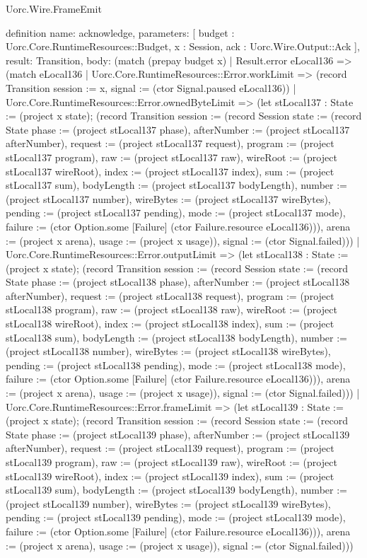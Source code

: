 \begin{lexlean}{Uorc.Wire.FrameEmit}
\begin{semanticmodule}
definition{
  name: acknowledge,
  parameters: [
    budget : Uorc.Core.RuntimeResources::Budget,
    x : Session,
    ack : Uorc.Wire.Output::Ack
  ],
  result: Transition,
  body: (match (prepay budget x)
    | Result.error eLocal136 => (match eLocal136
      | Uorc.Core.RuntimeResources::Error.workLimit => (record Transition {session := x, signal := (ctor Signal.paused eLocal136)})
      | Uorc.Core.RuntimeResources::Error.ownedByteLimit => (let stLocal137 : State := (project x state); (record Transition {session := (record Session {state := (record State {phase := (project stLocal137 phase), afterNumber := (project stLocal137 afterNumber), request := (project stLocal137 request), program := (project stLocal137 program), raw := (project stLocal137 raw), wireRoot := (project stLocal137 wireRoot), index := (project stLocal137 index), sum := (project stLocal137 sum), bodyLength := (project stLocal137 bodyLength), number := (project stLocal137 number), wireBytes := (project stLocal137 wireBytes), pending := (project stLocal137 pending), mode := (project stLocal137 mode), failure := (ctor Option.some [Failure] (ctor Failure.resource eLocal136))}), arena := (project x arena), usage := (project x usage)}), signal := (ctor Signal.failed)}))
      | Uorc.Core.RuntimeResources::Error.outputLimit => (let stLocal138 : State := (project x state); (record Transition {session := (record Session {state := (record State {phase := (project stLocal138 phase), afterNumber := (project stLocal138 afterNumber), request := (project stLocal138 request), program := (project stLocal138 program), raw := (project stLocal138 raw), wireRoot := (project stLocal138 wireRoot), index := (project stLocal138 index), sum := (project stLocal138 sum), bodyLength := (project stLocal138 bodyLength), number := (project stLocal138 number), wireBytes := (project stLocal138 wireBytes), pending := (project stLocal138 pending), mode := (project stLocal138 mode), failure := (ctor Option.some [Failure] (ctor Failure.resource eLocal136))}), arena := (project x arena), usage := (project x usage)}), signal := (ctor Signal.failed)}))
      | Uorc.Core.RuntimeResources::Error.frameLimit => (let stLocal139 : State := (project x state); (record Transition {session := (record Session {state := (record State {phase := (project stLocal139 phase), afterNumber := (project stLocal139 afterNumber), request := (project stLocal139 request), program := (project stLocal139 program), raw := (project stLocal139 raw), wireRoot := (project stLocal139 wireRoot), index := (project stLocal139 index), sum := (project stLocal139 sum), bodyLength := (project stLocal139 bodyLength), number := (project stLocal139 number), wireBytes := (project stLocal139 wireBytes), pending := (project stLocal139 pending), mode := (project stLocal139 mode), failure := (ctor Option.some [Failure] (ctor Failure.resource eLocal136))}), arena := (project x arena), usage := (project x usage)}), signal := (ctor Signal.failed)}))
}
\end{semanticmodule}
\end{lexlean}
